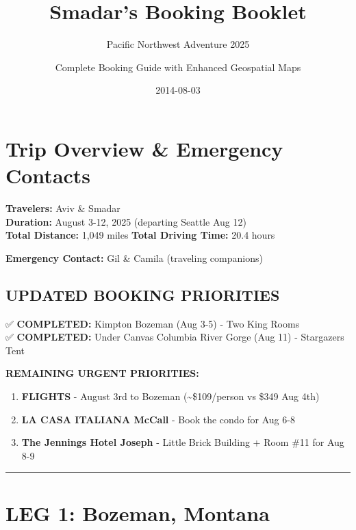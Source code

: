 \documentclass[
  11pt,
]{article}
\title{Smadar's Booking Booklet}
\subtitle{Pacific Northwest Adventure 2025}
\author{Complete Booking Guide with Enhanced Geospatial Maps}
\date{2014-08-03}
\begin{document}
\maketitle


\section{\texorpdfstring{\textcolor{primary}{Trip Overview \& Emergency Contacts}}{}}\label{section}

\textbf{\textcolor{secondary}{Travelers:}} Aviv \& Smadar\\
\textbf{\textcolor{secondary}{Duration:}} August 3-12, 2025 (departing
Seattle Aug 12)\\
\textbf{\textcolor{secondary}{Total Distance:}} 1,049 miles \textbar{}
\textbf{\textcolor{secondary}{Total Driving Time:}} 20.4 hours

\textbf{\textcolor{primary}{Emergency Contact:}} Gil \& Camila
(traveling companions)

\subsection{\texorpdfstring{\textcolor{primary}{UPDATED BOOKING PRIORITIES}}{}}\label{section-1}

✅ \textbf{\textcolor{primary}{COMPLETED:}} Kimpton Bozeman (Aug 3-5) -
Two King Rooms\\
✅ \textbf{\textcolor{primary}{COMPLETED:}} Under Canvas Columbia River
Gorge (Aug 11) - Stargazers Tent

\textbf{\textcolor{secondary}{REMAINING URGENT PRIORITIES:}}

\begin{enumerate}
\def\labelenumi{\arabic{enumi}.}
\item
  \textbf{\textcolor{primary}{FLIGHTS}} - August 3rd to Bozeman
  (\textasciitilde\$109/person vs \$349 Aug 4th)
\item
  \textbf{\textcolor{primary}{LA CASA ITALIANA McCall}} - Book the condo
  for Aug 6-8
\item
  \textbf{\textcolor{primary}{The Jennings Hotel Joseph}} - Little Brick
  Building + Room \#11 for Aug 8-9
\end{enumerate}

\begin{center}\rule{0.5\linewidth}{0.5pt}\end{center}

\newpage

\section{\texorpdfstring{\textcolor{primary}{LEG 1: Bozeman, Montana}}{}}\label{section-2}
\end{document}

